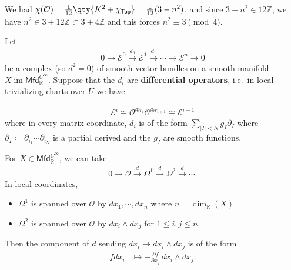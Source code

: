 \begin{remark}

We had
\(\chi({\mathcal{O}}) = {1\over 12} \qty{ K^2 + \chi_{\mathsf{Top}}} = {1\over 12}(3-n^2)\),
and since \(3-n^2 \in 12{\mathbb{Z}}\), we have
\(n^2 \in 3 + 12{\mathbb{Z}}\subset 3 + 4{\mathbb{Z}}\) and this forces
\(n^2 \equiv 3 \pmod 4\).

\end{remark}

\begin{definition}

Let
\begin{align*}
0 \to \mathcal{E}^0 \xrightarrow{d_0} \mathcal{E}^1 \xrightarrow{d_1} \cdots \to \mathcal{E}^n \to 0
\end{align*}
be a complex (so \(d^2 = 0\)) of smooth vector bundles on a smooth
manifold \(X\operatorname{im}{\mathsf{Mfd}}_{\mathbb{R}}^{C^\infty}\).
Suppose that the \(d_i\) are \textbf{differential operators}, i.e.~in
local trivializing charts over \(U\) we have

\begin{align*}
\mathcal{E}^i \cong {\mathcal{O}}^{\oplus r_i} {\mathcal{O}}^{\oplus r_{i+1}} \cong \mathcal{E}^{i+1}
\end{align*}
where in every matrix coordinate, \(d_i\) is of the form
\(\sum_{{\left\lvert {I} \right\rvert} < N} g_I {{\partial}}_I\) where
\({{\partial}}_I \coloneqq{{\partial}}_{i_1} \cdots {{\partial}}_{i_N}\)
is a partial derived and the \(g_I\) are smooth functions.

\end{definition}

\begin{example}[?]

For \(X\in {\mathsf{Mfd}}_{\mathbb{R}}^{C^ \infty }\), we can take
\begin{align*}
0 \to {\mathcal{O}}\xrightarrow{d} \Omega^1 \xrightarrow{d} \Omega^2 \xrightarrow{d} \cdots
.\end{align*}
In local coordinates,

\begin{itemize}
\tightlist
\item
  \(\Omega^1\) is spanned over \({\mathcal{O}}\) by
  \(dx_1, \cdots, dx_n\) where \(n = \dim_{\mathbb{R}}(X)\)
\item
  \(\Omega^2\) is spanned over \({\mathcal{O}}\) by \(dx_i \wedge dx_j\)
  for \(1\leq i, j \leq n\).
\end{itemize}

Then the component of \(d\) sending \(dx_i \to dx_i \wedge dx_j\) is of
the form
\begin{align*}
fdx_i &\mapsto -{\frac{\partial f}{\partial x_j}\,} dx_i \wedge dx_j
.\end{align*}

\end{example}

